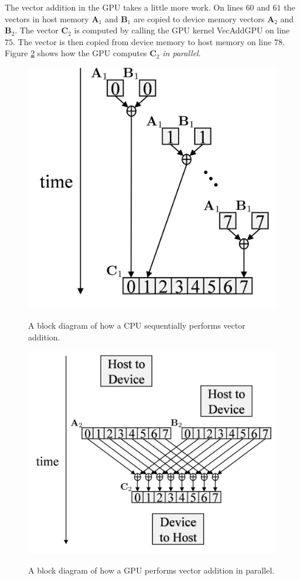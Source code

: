 The vector addition in the GPU takes a little more work. 
On lines $60$ and $61$ the vectors in host memory $\mathbf{A}_1$ and $\mathbf{B}_1$ are copied to device memory vectors $\mathbf{A}_2$ and $\mathbf{B}_2$.
The vector $\mathbf{C}_2$ is computed by calling the GPU kernel VecAddGPU on line $75$.
The vector is then copied from device memory to host memory on line $78$.
Figure \ref{fig:GPUaddBlockDiagram} shows how the GPU computes $\mathbf{C}_2$ \textit{in parallel}.
\begin{figure}
	\centering\includegraphics[width=3.17in/100*55]{figures/gpu_intro/CPUaddBlockDiagram.pdf}
	\label{fig:CPUaddBlockDiagram}
	\caption{A block diagram of how a CPU sequentially performs vector addition.}
\end{figure}
\begin{figure}
	\centering\includegraphics[width=4.69in/100*55]{figures/gpu_intro/GPUaddBlockDiagram.pdf}
	\label{fig:GPUaddBlockDiagram}
	\caption{A block diagram of how a GPU performs vector addition in parallel.}
\end{figure}

